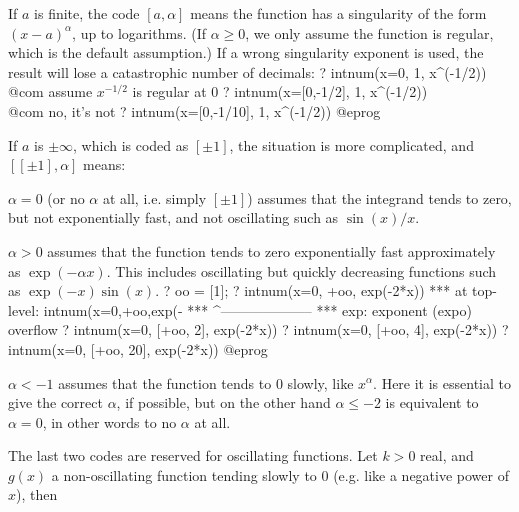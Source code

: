 If $a$ is finite, the code $[a,\alpha]$ means the function has a
singularity of the form $(x-a)^{\alpha}$, up to logarithms. (If $\alpha \ge
0$, we only assume the function is regular, which is the default assumption.)
If a wrong singularity exponent is used, the result will lose a catastrophic
number of decimals:
\bprog
? intnum(x=0, 1, x^(-1/2))         \\@com assume $x^{-1/2}$ is regular at 0
? intnum(x=[0,-1/2], 1, x^(-1/2))  \\@com no, it's not
? intnum(x=[0,-1/10], 1, x^(-1/2))
@eprog

If $a$ is $\pm\infty$, which is coded as $[\pm 1]$, the situation is more
complicated, and $[[\pm1],\alpha]$ means:

\item $\alpha=0$ (or no $\alpha$ at all, i.e. simply $[\pm1]$) assumes that the
integrand tends to zero, but not exponentially fast, and not
oscillating such as $\sin(x)/x$.

\item $\alpha>0$ assumes that the function tends to zero exponentially fast
approximately as $\exp(-\alpha x)$. This includes oscillating but quickly
decreasing functions such as $\exp(-x)\sin(x)$.
\bprog
? oo = [1];
? intnum(x=0, +oo, exp(-2*x))
  ***   at top-level: intnum(x=0,+oo,exp(-
  ***                 ^--------------------
  *** exp: exponent (expo) overflow
? intnum(x=0, [+oo, 2], exp(-2*x))
? intnum(x=0, [+oo, 4], exp(-2*x))
? intnum(x=0, [+oo, 20], exp(-2*x))
@eprog

\item $\alpha<-1$ assumes that the function tends to $0$ slowly, like
$x^{\alpha}$. Here it is essential to give the correct $\alpha$, if possible,
but on the other hand $\alpha\le -2$ is equivalent to $\alpha=0$, in other
words to no $\alpha$ at all.

\smallskip The last two codes are reserved for oscillating functions.
Let $k > 0$ real, and $g(x)$ a non-oscillating function tending slowly to $0$
(e.g. like a negative power of $x$), then

